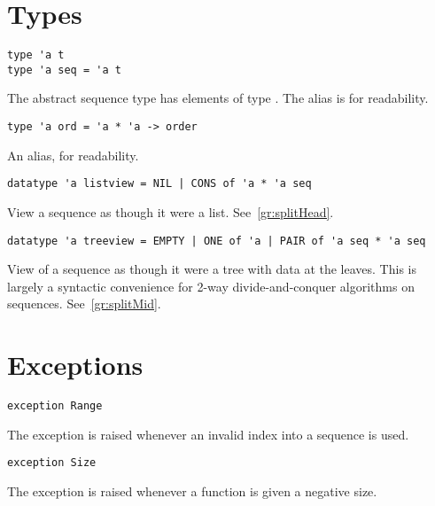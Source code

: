 \section{Types}

\begin{gram}
\begin{verbatim}
type 'a t
type 'a seq = 'a t
\end{verbatim}
The abstract sequence type  has elements of type . The alias
 is for readability.
\end{gram}

\begin{gram}
\begin{verbatim}
type 'a ord = 'a * 'a -> order
\end{verbatim}
An alias, for readability.
\end{gram}

\begin{gram}
\begin{verbatim}
datatype 'a listview = NIL | CONS of 'a * 'a seq
\end{verbatim}
View a sequence as though it were a list. See~\ref{gr:splitHead}.
\end{gram}

\begin{gram}
\begin{verbatim}
datatype 'a treeview = EMPTY | ONE of 'a | PAIR of 'a seq * 'a seq
\end{verbatim}
View of a sequence as though it were a tree with data at the leaves.
This is largely a syntactic convenience for 2-way divide-and-conquer algorithms
on sequences. See~\ref{gr:splitMid}.
\end{gram}

\section{Exceptions}

\begin{gram}
\begin{verbatim}
exception Range
\end{verbatim}
The  exception is raised whenever an invalid index into a sequence is used.
\end{gram}

\begin{gram}
\begin{verbatim}
exception Size
\end{verbatim}
The  exception is raised whenever a function is given a negative size.
\end{gram}


